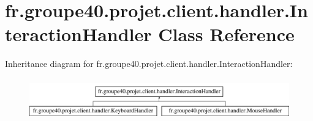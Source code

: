 \hypertarget{classfr_1_1groupe40_1_1projet_1_1client_1_1handler_1_1_interaction_handler}{}\section{fr.\+groupe40.\+projet.\+client.\+handler.\+Interaction\+Handler Class Reference}
\label{classfr_1_1groupe40_1_1projet_1_1client_1_1handler_1_1_interaction_handler}
Inheritance diagram for fr.\+groupe40.\+projet.\+client.\+handler.\+Interaction\+Handler\+:\begin{figure}[H]
\begin{center}
\leavevmode
\includegraphics[height=1.794872cm]{classfr_1_1groupe40_1_1projet_1_1client_1_1handler_1_1_interaction_handler}
\end{center}
\end{figure}
